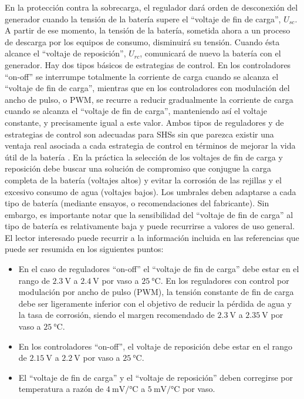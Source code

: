 En la protección contra la sobrecarga, el regulador dará orden de
desconexión del generador cuando la tensión de la batería supere el
{}``voltaje de fin de carga'', $U_{sc}$.
A partir de ese momento, la tensión de la batería, sometida ahora
a un proceso de descarga por los equipos de consumo, disminuirá su
tensión. Cuando ésta alcance el {}``voltaje de reposición'', $U_{rc}$,
comunicará de nuevo la batería con el generador. Hay dos tipos básicos
de estrategias de control. En los controladores {}``on-off'' se
interrumpe totalmente la corriente de carga cuando se alcanza el \textquotedblleft{}voltaje
de fin de carga\textquotedblright{}, mientras que en los controladores
con \textquotedbl{}modulación del ancho de pulso\textquotedbl{}, o
PWM, se recurre a reducir gradualmente la corriente de carga cuando
se alcanza el \textquotedblleft{}voltaje de fin de carga\textquotedblright{},
manteniendo así el voltaje constante, y precisamente igual a este
valor. Ambos tipos de reguladores y de estrategias de control son
adecuadas para SHSs sin que parezca existir una ventaja real asociada
a cada estrategia de control en términos de mejorar la vida útil de
la batería \citep{Egido.Lorenzo1998}. En la práctica la selección
de los voltajes de fin de carga y reposición debe buscar una solución
de compromiso que conjugue la carga completa de la batería (voltajes
altos) y evitar la corrosión de las rejillas y el excesivo consumo
de agua (voltajes bajos). Los umbrales deben adaptarse a cada tipo
de batería (mediante ensayos, o recomendaciones del fabricante). Sin
embargo, es importante notar que la sensibilidad del \textquotedblleft{}voltaje
de fin de carga\textquotedblright{} al tipo de batería es relativamente
baja y puede recurrirse a valores de uso general. El lector interesado
puede recurrir a la información incluida en las referencias \citep{Egido.Lorenzo1998,Usher.Ross1998}
que puede ser resumida en los siguientes puntos:
\begin{itemize}
\item En el caso de reguladores {}``on-off'' el \textquotedblleft{}voltaje
de fin de carga\textquotedblright{} debe estar en el rango de $\SI{2.3}{\volt}$
a $\SI{2.4}{\volt}$ por vaso a $\SI{25}{\celsius}$. En los reguladores
con control por modulación por ancho de pulso (PWM), la tensión constante
de fin de carga debe ser ligeramente inferior con el objetivo de reducir
la pérdida de agua y la tasa de corrosión, siendo el margen recomendado
de $\SI{2.3}{\volt}$ a $\SI{2.35}{\volt}$ por vaso a $\SI{25}{\celsius}$.
\item En los controladores \textquotedblleft{}on-off\textquotedblright{},
el voltaje de reposición debe estar en el rango de $\SI{2.15}{\volt}$
a $\SI{2.2}{\volt}$ por vaso a $\SI{25}{\celsius}$. 
\item El \textquotedblleft{}voltaje de fin de carga\textquotedblright{}
y el \textquotedblleft{}voltaje de reposición\textquotedblright{}
deben corregirse por temperatura a razón de $\SI{4}{\milli\volt\per\celsius}$
a $\SI{5}{\milli\volt\per\celsius}$ por vaso.
\end{itemize}
